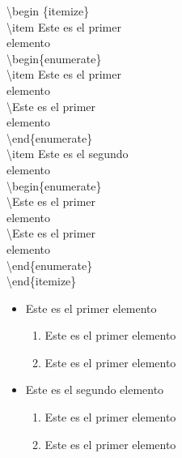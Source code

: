 \documentclass{article}
\begin{document}
\begin{multicols}{2}
\noindent
\textbackslash begin \{itemize\}\\
\textbackslash item Este es el primer\\
elemento\\
\hspace*{1cm}\textbackslash begin\{enumerate\}\\
\hspace*{1cm}\textbackslash item Este es el primer\\
\hspace*{1cm}elemento\\
\hspace*{1cm} \textbackslash Este es el primer\\\hspace*{1cm}elemento\\
\hspace*{1cm} \textbackslash end\{enumerate\}\\
\textbackslash item Este es el segundo\\
elemento\\
\hspace*{1cm} \textbackslash begin\{enumerate\}\\
\hspace*{1cm} \textbackslash Este es el primer\\\hspace*{1cm}elemento\\
\hspace*{1cm} \textbackslash Este es el primer\\\hspace*{1cm}elemento\\
\hspace*{1cm} \textbackslash end\{enumerate\}\\
\textbackslash end\{itemize\}
\columnbreak
\begin{itemize}
\item Este es el primer elemento
	\begin{enumerate}
	\item Este es el primer elemento
	\item Este es el primer elemento
	\end{enumerate}
\item Este es el segundo elemento
	\begin{enumerate}
	\item Este es el primer elemento
	\item Este es el primer elemento
	\end{enumerate}
\end{itemize}
\end{multicols}
\end{document}
